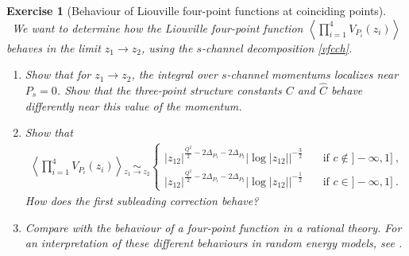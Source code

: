 \documentclass[12pt, a4paper, notitlepage, twoside]{report}
\numberwithin{equation}{section}
\theoremstyle{break}
\newtheorem{exo}{Exercise}[chapter]
\begin{document}
\begin{exo}[Behaviour of Liouville four-point functions at coinciding points]
~\label{exo4a} 
We want to determine how the Liouville four-point function $\left<\prod_{i=1}^4 V_{P_i}(z_i)\right>$ behaves in the limit $z_1\to z_2$, using the $s$-channel decomposition \eqref{vfcch}.
\begin{enumerate}
 \item Show that for $z_1\to z_2$, the integral over $s$-channel momentums localizes near $P_s=0$. Show that the three-point structure constants $C$ and $\hat C$ behave differently near this value of the momentum.
 \item Show that 
 \begin{align}
  \left<\prod_{i=1}^4 V_{P_i}(z_i)\right> \underset{z_1\to z_2}{\sim} \left\{
  \begin{array}{ll} 
  |z_{12}|^{\frac{Q^2}{2} -2\Delta_{P_1}-2\Delta_{P_2}} \left|\log|z_{12}|\right|^{-\frac32} &\quad \text{if \ } c\notin ]-\infty,1]\ ,
  \\
  |z_{12}|^{\frac{Q^2}{2} -2\Delta_{P_1}-2\Delta_{P_2}} \left|\log|z_{12}|\right|^{-\frac12} &\quad \text{if \ } c\in ]-\infty,1]\ .
  \end{array}\right.
 \end{align}
How does the first subleading correction behave?
\item Compare with the behaviour of a four-point function in a rational theory. 
For an interpretation of these different behaviours in random energy models, see \cite{clrs16}.
\end{enumerate}
\end{exo}
\end{document}
